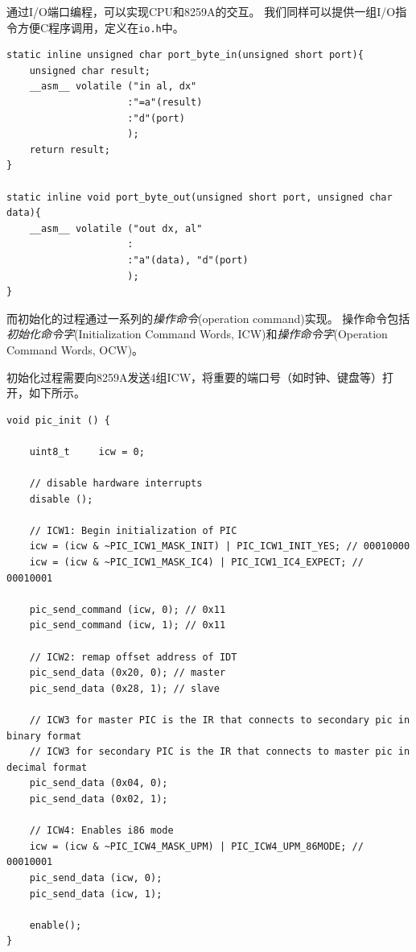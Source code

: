 \documentclass[logo,reportComp]{thesis}
\begin{document}
通过I/O端口编程，可以实现CPU和8259A的交互。
我们同样可以提供一组I/O指令方便C程序调用，定义在\verb'io.h'中。
\begin{lstlisting}
static inline unsigned char port_byte_in(unsigned short port){
	unsigned char result;
	__asm__ volatile ("in al, dx"
					 :"=a"(result)
					 :"d"(port)
					 );
	return result;
}

static inline void port_byte_out(unsigned short port, unsigned char data){
	__asm__ volatile ("out dx, al"
					 :
					 :"a"(data), "d"(port)
					 );
}
\end{lstlisting}

而初始化的过程通过一系列的\emph{操作命令}(operation command)实现。
操作命令包括\emph{初始化命令字}(Initialization Command Words, ICW)和\emph{操作命令字}(Operation Command Words, OCW)。

初始化过程需要向8259A发送4组ICW，将重要的端口号（如时钟、键盘等）打开，如下所示。
\begin{lstlisting}
void pic_init () {

	uint8_t		icw	= 0;

	// disable hardware interrupts
	disable ();

	// ICW1: Begin initialization of PIC
	icw = (icw & ~PIC_ICW1_MASK_INIT) | PIC_ICW1_INIT_YES; // 00010000
	icw = (icw & ~PIC_ICW1_MASK_IC4) | PIC_ICW1_IC4_EXPECT; // 00010001

	pic_send_command (icw, 0); // 0x11
	pic_send_command (icw, 1); // 0x11

	// ICW2: remap offset address of IDT
	pic_send_data (0x20, 0); // master
	pic_send_data (0x28, 1); // slave

	// ICW3 for master PIC is the IR that connects to secondary pic in binary format
	// ICW3 for secondary PIC is the IR that connects to master pic in decimal format
	pic_send_data (0x04, 0);
	pic_send_data (0x02, 1);

	// ICW4: Enables i86 mode
	icw = (icw & ~PIC_ICW4_MASK_UPM) | PIC_ICW4_UPM_86MODE; // 00010001
	pic_send_data (icw, 0);
	pic_send_data (icw, 1);

	enable();
}
\end{lstlisting}
\end{document}

